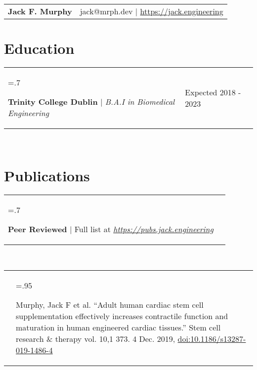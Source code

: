 \documentclass[letterpaper,11pt]{article}
\newcommand{\projHeadings}[2]{
    \begin{tabularx}{\textwidth} {>{\hsize=.7\textwidth\raggedright\arraybackslash}X 
   >{\raggedleft\arraybackslash}X}
      #1 & \small#2 \\
    \end{tabularx}
    \\
}
\newcommand{\projitems}[1]{
    \begin{tabularx}{\textwidth} {>{\raggedleft\arraybackslash}X | >{\hsize=.95\textwidth\raggedright\arraybackslash}X}
      & \small#1 \\
    \end{tabularx}
     \\
}
\newcommand{\heading}[3]{
    \hspace{-9mm}
    \begin{tabular}{p{.4\textwidth} >{\raggedleft}p{.57\textwidth}}
        \textbf{\Huge{#1}}\vspace{5mm} & #2 $|$ #3 \\
    \end{tabular}
}
\begin{document}
\heading
    {Jack F. Murphy}
    {jack@mrph.dev}
    {\href{https://jack.engineering}{https://jack.engineering}}

\section*{Education}
    \projHeadings
          {\textbf{Trinity College Dublin} $|$ \emph{B.A.I in Biomedical Engineering}}
          {Expected 2018 - 2023}
          {}

\section*{Publications}
    \projHeadings
          {\textbf{Peer Reviewed} $|$ Full list at \emph{\href{https://pubs.jack.engineering}{https://pubs.jack.engineering}}}
          {}
         \projitems
            {Murphy, Jack F et al. “Adult human cardiac stem cell supplementation effectively increases contractile function and maturation in human engineered cardiac tissues.” Stem cell research \& therapy vol. 10,1 373. 4 Dec. 2019, \href{https://doi.org/10.1186/s13287-019-1486-4}{doi:10.1186/s13287-019-1486-4}
            }

\end{document}
